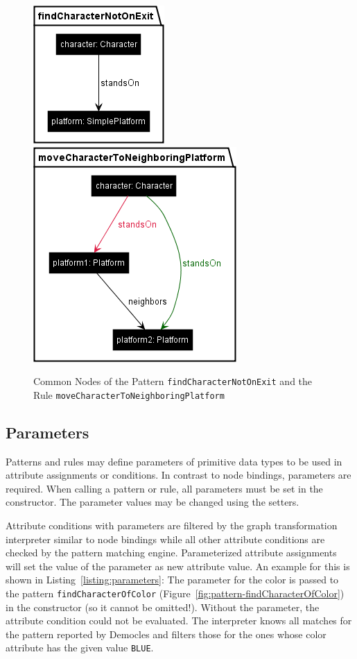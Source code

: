 \begin{figure}[h!]
	\centering
	\includegraphics[scale=0.7]{../common/figures/pattern-findCharacterNotOnExit}
	\includegraphics[scale=0.7]{../common/figures/rule-moveCharacterToNeighboringPlatform}
	\caption{Common Nodes of the Pattern \texttt{findCharacterNotOnExit} and the Rule \texttt{moveCharacterToNeighboringPlatform}}
	\label{fig:node-binding-common-nodes}
\end{figure}

\subsection{Parameters}
\label{api-parameters}
Patterns and rules may define parameters of primitive data types to be used in attribute assignments or conditions.
In contrast to node bindings, parameters are required.
When calling a pattern or rule, all parameters must be set in the constructor.
The parameter values may be changed using the setters.

Attribute conditions with parameters are filtered by the graph transformation interpreter similar to node bindings while all  other attribute conditions are checked by the pattern matching engine.
Parameterized attribute assignments will set the value of the parameter as new attribute value.
An example for this is shown in Listing~\ref{listing:parameters}:
The parameter for the color is passed to the pattern \texttt{findCharacterOfColor} (Figure~\ref{fig:pattern-findCharacterOfColor}) in the constructor (so it cannot be omitted!).
Without the parameter, the attribute condition could not be evaluated.
The interpreter knows all matches for the pattern reported by Democles and filters those for the ones whose color attribute has the given value \texttt{BLUE}.

